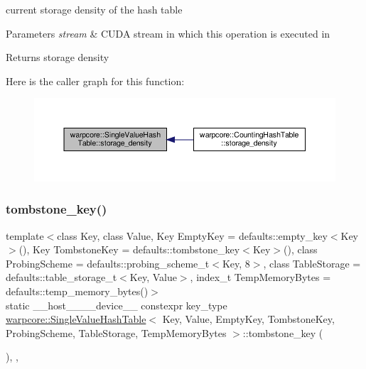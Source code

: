current storage density of the hash table 


\begin{DoxyParams}{Parameters}
{\em stream} & C\+U\+DA stream in which this operation is executed in \\
\hline
\end{DoxyParams}
\begin{DoxyReturn}{Returns}
storage density 
\end{DoxyReturn}
Here is the caller graph for this function\+:
\nopagebreak
\begin{figure}[H]
\begin{center}
\leavevmode
\includegraphics[width=350pt]{classwarpcore_1_1SingleValueHashTable_ac593bc68b452128ae4c6ce9217c5d333_icgraph}
\end{center}
\end{figure}
\mbox{\label{classwarpcore_1_1SingleValueHashTable_afd4fb9761ef0fd1a497a9cff5f5bd52e}} 
\subsubsection{\texorpdfstring{tombstone\+\_\+key()}{tombstone\_key()}}
{\footnotesize\ttfamily template$<$class Key, class Value, Key Empty\+Key = defaults\+::empty\+\_\+key$<$\+Key$>$(), Key Tombstone\+Key = defaults\+::tombstone\+\_\+key$<$\+Key$>$(), class Probing\+Scheme = defaults\+::probing\+\_\+scheme\+\_\+t$<$\+Key, 8$>$, class Table\+Storage = defaults\+::table\+\_\+storage\+\_\+t$<$\+Key, Value$>$, index\+\_\+t Temp\+Memory\+Bytes = defaults\+::temp\+\_\+memory\+\_\+bytes()$>$ \\
static \+\_\+\+\_\+host\+\_\+\+\_\+\+\_\+\+\_\+device\+\_\+\+\_\+ constexpr key\+\_\+type \hyperlink{classwarpcore_1_1SingleValueHashTable}{warpcore\+::\+Single\+Value\+Hash\+Table}$<$ Key, Value, Empty\+Key, Tombstone\+Key, Probing\+Scheme, Table\+Storage, Temp\+Memory\+Bytes $>$\+::tombstone\+\_\+key (\begin{DoxyParamCaption}{ }\end{DoxyParamCaption})\hspace{0.3cm}{\ttfamily [inline]}, {\ttfamily [static]}, {\ttfamily [noexcept]}}



